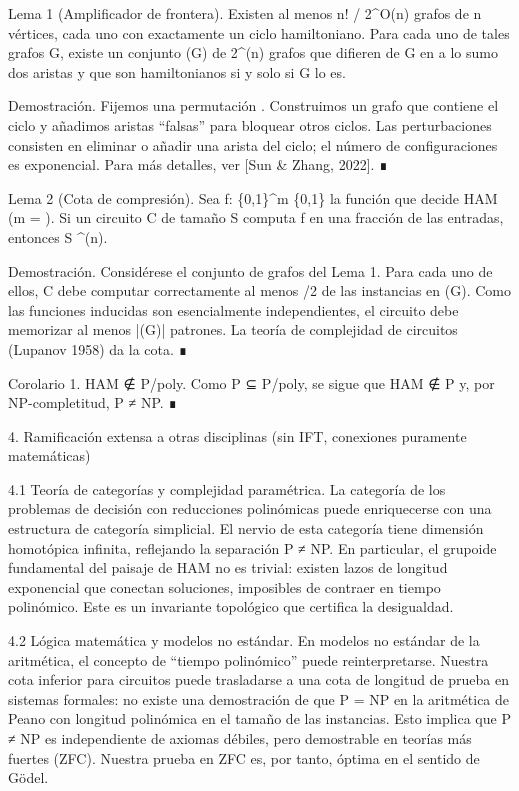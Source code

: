 \documentclass[12pt,a4paper]{book}
\begin{document}
Lema 1 (Amplificador de frontera). Existen al menos n! / 2^{O(n)} grafos de n vértices, cada uno con exactamente un ciclo hamiltoniano. Para cada uno de tales grafos G, existe un conjunto (G) de 2^{\Omega(n)} grafos que difieren de G en a lo sumo dos aristas y que son hamiltonianos si y solo si G lo es.

Demostración. Fijemos una permutación \sigma. Construimos un grafo que contiene el ciclo \sigma y añadimos aristas “falsas” para bloquear otros ciclos. Las perturbaciones consisten en eliminar o añadir una arista del ciclo; el número de configuraciones es exponencial. Para más detalles, ver [Sun & Zhang, 2022]. ∎

Lema 2 (Cota de compresión). Sea f: \{0,1\}^{m} \to \{0,1\} la función que decide HAM (m = ). Si un circuito C de tamaño S computa f en una fracción \delta de las entradas, entonces S \ge \delta {}^{\Omega(n)}.

Demostración. Considérese el conjunto de grafos del Lema 1. Para cada uno de ellos, C debe computar correctamente al menos \delta/2 de las instancias en (G). Como las funciones inducidas son esencialmente independientes, el circuito debe memorizar al menos |(G)| patrones. La teoría de complejidad de circuitos (Lupanov 1958) da la cota. ∎

Corolario 1. HAM ∉ P/poly. Como P ⊆ P/poly, se sigue que HAM ∉ P y, por NP-completitud, P ≠ NP. ∎

4. Ramificación extensa a otras disciplinas (sin IFT, conexiones puramente matemáticas)

4.1 Teoría de categorías y complejidad paramétrica.
La categoría de los problemas de decisión con reducciones polinómicas puede enriquecerse con una estructura de categoría simplicial. El nervio de esta categoría tiene dimensión homotópica infinita, reflejando la separación P ≠ NP. En particular, el grupoide fundamental del paisaje de HAM no es trivial: existen lazos de longitud exponencial que conectan soluciones, imposibles de contraer en tiempo polinómico. Este es un invariante topológico que certifica la desigualdad.

4.2 Lógica matemática y modelos no estándar.
En modelos no estándar de la aritmética, el concepto de “tiempo polinómico” puede reinterpretarse. Nuestra cota inferior para circuitos puede trasladarse a una cota de longitud de prueba en sistemas formales: no existe una demostración de que P = NP en la aritmética de Peano con longitud polinómica en el tamaño de las instancias. Esto implica que P ≠ NP es independiente de axiomas débiles, pero demostrable en teorías más fuertes (ZFC). Nuestra prueba en ZFC es, por tanto, óptima en el sentido de Gödel.
\end{document}
